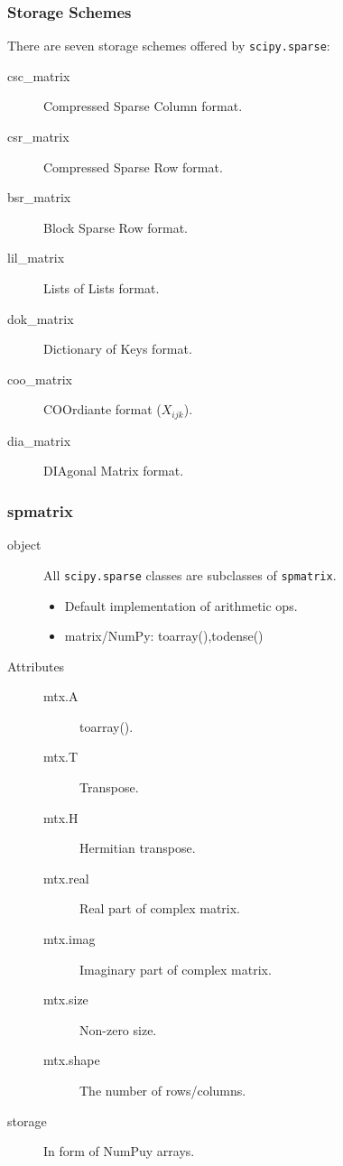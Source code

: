 \documentclass[10pt,colorlinks]{beamer}
\begin{document}
\begin{frame}[fragile]\frametitle{Storage Schemes}
There are seven storage schemes offered by \verb|scipy.sparse|:
\begin{description}
    \item[csc\_matrix] Compressed Sparse Column format.
    \item[csr\_matrix] Compressed Sparse Row format.
    \item[bsr\_matrix] Block Sparse Row format. 
    \item[lil\_matrix] Lists of Lists format.
    \item[dok\_matrix] Dictionary of Keys format.
    \item[coo\_matrix] COOrdiante format ($X_{ijk}$).
    \item[dia\_matrix] DIAgonal Matrix format. 
\end{description}
\end{frame}

\begin{frame}[fragile]\frametitle{spmatrix}
 
\begin{description}
    \item[object] All \verb|scipy.sparse| classes are subclasses of \verb|spmatrix|.
 \begin{itemize}
    \item Default implementation of arithmetic ops.
    \item matrix/NumPy: toarray(),todense()
 \end{itemize}
    \item[Attributes]
\begin{description}
    \item[mtx.A] toarray().
    \item[mtx.T] Transpose.
    \item[mtx.H] Hermitian transpose.
    \item[mtx.real] Real part of complex matrix.
    \item[mtx.imag] Imaginary part of complex matrix.
    \item[mtx.size] Non-zero size.
    \item[mtx.shape] The number of rows/columns.
\end{description}
    \item[storage] In form of NumPuy arrays.
\end{description}
\end{frame}
\end{document}
